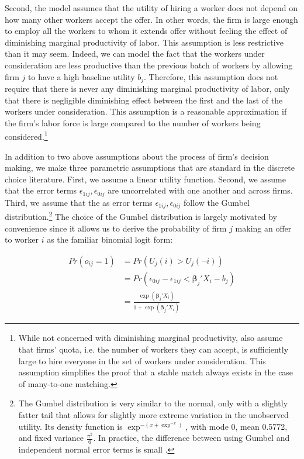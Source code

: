 Second, the model assumes that the utility of hiring a worker does not depend on
how many other workers accept the offer. In other words, the firm is large
enough to employ all the workers to whom it extends offer without feeling the
effect of diminishing marginal productivity of labor. This assumption is less
restrictive than it may seem. Indeed, we can model the fact that the workers
under consideration are less productive than the previous batch of workers by
allowing firm $j$ to have a high baseline utility $b_j$. Therefore, this
assumption does not require that there is never any diminishing marginal
productivity of labor, only that there is negligible diminishing effect between
the first and the last of the workers under consideration. This assumption is a
reasonable approximation if the firm's labor force is large compared to the
number of workers being considered.\footnote{While not concerned with
  diminishing marginal productivity, \citet{Roth1992} also assume that firms'
  quota, i.e. the number of workers they can accept, is sufficiently large to
  hire everyone in the set of workers under consideration. This assumption
  simplifies the proof that a stable match always exists in the case of
  many-to-one matching.}

In addition to two above assumptions about the process of firm's decision
making, we make three parametric assumptions that are standard in the discrete
choice literature. First, we assume a linear utility function. Second, we assume
that the error terms $\epsilon_{1ij}, \epsilon_{0ij}$ are uncorrelated with one
another and across firms. Third, we assume that the as error terms
$\epsilon_{1ij}, \epsilon_{0ij}$ follow the Gumbel distribution.\footnote{The
  Gumbel distribution is very similar to the normal, only with a slightly fatter
  tail that allows for slightly more extreme variation in the unobserved
  utility. Its density function is $\exp^{-(x + \exp^{-x})}$, with mode 0, mean
  0.5772, and fixed variance $\frac{\pi^2}{6}$. In practice, the difference
  between using Gumbel and independent normal error terms is small
  \citep{Train2009}.} The choice of the Gumbel distribution is largely motivated
by convenience since it allows us to derive the probability of firm $j$ making
an offer to worker $i$ as the familiar binomial logit form:

\begin{align}
  Pr(o_{ij} = 1) &= Pr(U_j(i) > U_j(\neg i)) \\
                 &= Pr(\epsilon_{0ij} - \epsilon_{1ij} <  \bm{\beta}_j ' X_i - b_j) \\
                 &= \frac{\exp({\bm{\beta}_j'X_i})}{1 + \exp({\bm{\beta}_j'X_i})} \label{eq:prob_offer_ij}
\end{align}

